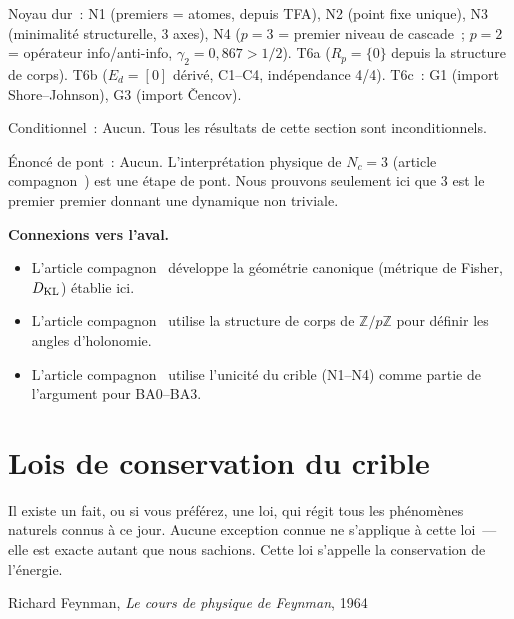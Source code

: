 \documentclass[12pt,a4paper]{article}
\begin{document}
\begin{ledgerbox}
Noyau dur~:
  N1 (premiers = atomes, depuis TFA), N2 (point fixe unique), N3
  (minimalité structurelle, 3 axes), N4 ($p=3$ = premier niveau de
  cascade~; $p=2$ = opérateur info/anti-info,
  $\gamma_2 = 0{,}867 > 1/2$).
  T6a ($R_p=\{0\}$ depuis la structure de corps).
  T6b ($E_d=[0]$ dérivé, C1--C4, indépendance 4/4).
  T6c~: G1 (import Shore--Johnson), G3 (import \v{C}encov).

Conditionnel~:
  Aucun. Tous les résultats de cette section sont inconditionnels.

Énoncé de pont~:
  Aucun. L'interprétation physique de $N_c = 3$ (article
  compagnon~\cite{companion_M5}) est une étape de pont. Nous prouvons
  seulement ici que 3 est le premier premier donnant une dynamique
  non triviale.
\end{ledgerbox}

\medskip\noindent\textbf{Connexions vers l'aval.}
\begin{itemize}
\item L'article compagnon~\cite{companion_M2} développe la géométrie
  canonique (métrique de Fisher, $D_{\mathrm{KL}}$) établie ici.
\item L'article compagnon~\cite{companion_M2} utilise la structure de
  corps de $\mathbb{Z}/p\mathbb{Z}$ pour définir les angles
  d'holonomie.
\item L'article compagnon~\cite{companion_M5} utilise l'unicité du
  crible (N1--N4) comme partie de l'argument pour BA0--BA3.
\end{itemize}

\section{Lois de conservation du crible}
\label{sec:conservation}

\epigraph{Il existe un fait, ou si vous préférez, une loi, qui régit tous les
phénomènes naturels connus à ce jour. Aucune exception connue ne s'applique à
cette loi~--- elle est exacte autant que nous sachions. Cette loi s'appelle la
conservation de l'énergie.}{Richard Feynman, \textit{Le cours de physique de
Feynman}, 1964}
\end{document}
